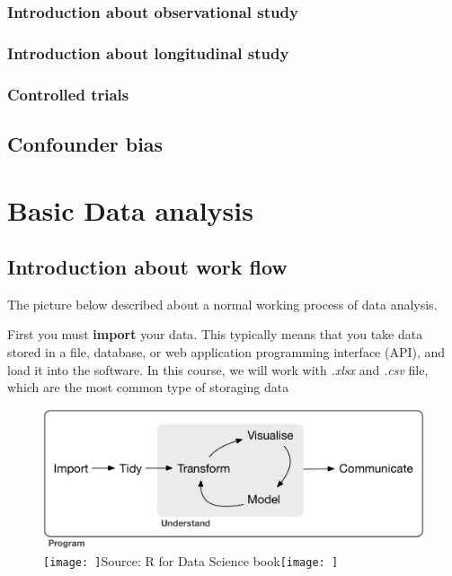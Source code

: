 \documentclass[
]{article}
\begin{document}
\hypertarget{introduction-about-observational-study}{%
\subsubsection{Introduction about observational study}\label{introduction-about-observational-study}}

\hypertarget{introduction-about-longitudinal-study}{%
\subsubsection{Introduction about longitudinal study}\label{introduction-about-longitudinal-study}}

\hypertarget{controlled-trials}{%
\subsubsection{Controlled trials}\label{controlled-trials}}

\hypertarget{confounder-bias}{%
\subsection{Confounder bias}\label{confounder-bias}}

\hypertarget{basic-data-analysis}{%
\section{Basic Data analysis}\label{basic-data-analysis}}

\hypertarget{introduction-about-work-flow}{%
\subsection{Introduction about work flow}\label{introduction-about-work-flow}}

The picture below described about a normal working process of data analysis.

First you must \textbf{import} your data. This typically means that you take data stored in a file, database, or web application programming interface (API), and load it into the software. In this course, we will work with \emph{.xlsx} and \emph{.csv} file, which are the most common type of storaging data

\begin{figure}
\centering
\includegraphics{images/data-science.png}
\caption{\texttt{[image: ]}Source: R for Data Science book\texttt{[image: ]}}
\end{figure}
\end{document}
